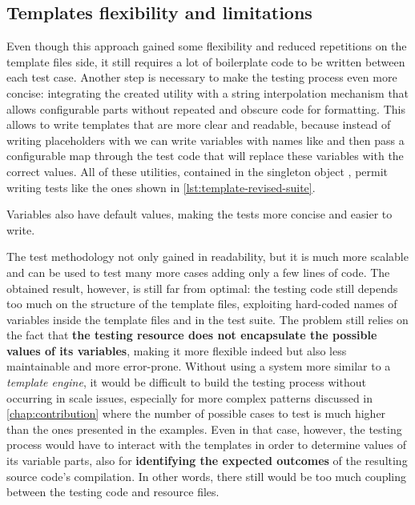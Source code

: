 \documentclass[12pt,a4paper,openright,twoside]{book}
\begin{document}


\subsection{Templates flexibility and limitations}

Even though this approach gained some flexibility and reduced repetitions on the
template files side, it still requires a lot of boilerplate code to be written
between each test case. Another step is necessary to make the testing process
even more concise: integrating the created utility with a string interpolation
mechanism that allows configurable parts without repeated and obscure code for
formatting. 
%
This allows to write templates that are more clear and readable, because instead
of writing placeholders with  we can write variables with names 
like  and then pass a configurable map 
through the test code that will replace these variables with the correct values.
All of these utilities, contained in the singleton object ,
permit writing tests like the ones shown in \cref{lst:template-revised-suite}.
%

%
Variables also have default values, making the tests more concise and easier to
write. 

The test methodology not only gained in readability, but it is much more
scalable and can be used to test many more cases adding only a few lines of
code. 
%
The obtained result, however, is still far from optimal: the testing code still
depends too much on the structure of the template files, exploiting hard-coded
names of variables inside the template files and in the test suite. The problem
still relies on the fact that \textbf{the testing resource does not encapsulate
the possible values of its variables}, making it more flexible indeed but also
less maintainable and more error-prone. 
%
Without using a system more similar to a \emph{template engine}, it would be
difficult to build the testing process without occurring in scale issues,
especially for more complex patterns discussed in \cref{chap:contribution} where
the number of possible cases to test is much higher than the ones presented in
the examples. Even in that case, however, the testing process would have to
interact with the templates in order to determine values of its variable parts,
also for \textbf{identifying the expected outcomes} of the resulting source
code's compilation. In other words, there still would be too much coupling
between the testing code and resource files.
\end{document}
